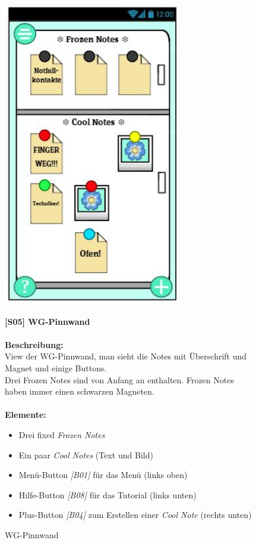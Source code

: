 \documentclass[a4paper]{scrreprt}
\begin{document}
    	\begin{figure}[h]
    		\begin{minipage}[b]{0.4\linewidth}
    			
    			\flushright
    			\centering
    			\includegraphics[width=0.7\textwidth]{fridget_fridge.JPG}
    			\caption{WG-Pinnwand}
    			\label{fig:figure1}
    			\vspace{8cm}
    		\end{minipage}
    		\hspace{0.5cm}
    		\begin{minipage}[b]{0.55\linewidth}
    			\flushleft
    			\textbf{{[}S05{]} WG-Pinnwand} \\
    			\hfill
    			\\\textbf{Beschreibung:} \\
    			View der WG-Pinnwand, man sieht die Notes mit Überschrift und Magnet und einige Buttons. \\ Drei Frozen Notes sind von Anfang an enthalten. Frozen Notes haben immer einen schwarzen Magneten.
    			\\
    			\hfill
    			\\\textbf{Elemente:}
    			\begin{itemize}
    				\renewcommand\labelitemi{--}
    				\item  Drei fixed \textit{Frozen Notes}
    				\item Ein paar \textit{Cool Notes} (Text und Bild)
    				\item Menü-Button \textit{{[}B01{]}} für das Menü (links oben)
    				\item Hilfe-Button \textit{{[}B08{]}} für das Tutorial (links unten)
    				\item Plus-Button \textit{{[}B04{]}} zum Erstellen einer \textit{Cool Note}
    				(rechts unten)
    				

\end{itemize}
\end{minipage}
\end{figure}
\end{document}
